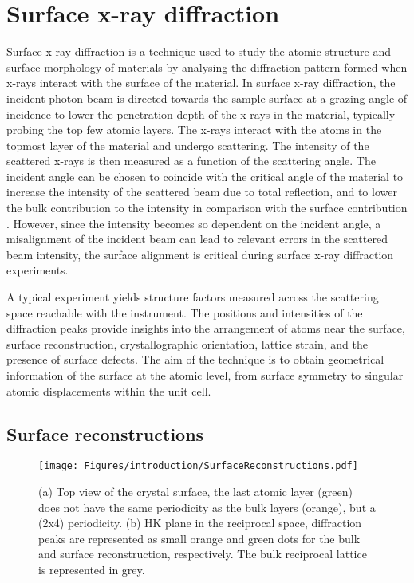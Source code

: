 \section{Surface x-ray diffraction} \label{sec:SXRD}

Surface x-ray diffraction is a technique used to study the atomic structure and surface morphology of materials by analysing the diffraction pattern formed when x-rays interact with the surface of the material.
In surface x-ray diffraction, the incident photon beam is directed towards the sample surface at a grazing angle of incidence to lower the penetration depth of the x-rays in the material, typically probing the top few atomic layers.
The x-rays interact with the atoms in the topmost layer of the material and undergo scattering.
The intensity of the scattered x-rays is then measured as a function of the scattering angle.
The incident angle can be chosen to coincide with the critical angle of the material to increase the intensity of the scattered beam due to total reflection, and to lower the bulk contribution to the intensity in comparison with the surface contribution \parencite{Feidenhansl1989, Moritz2022}.
However, since the intensity becomes so dependent on the incident angle, a misalignment of the incident beam can lead to relevant errors in the scattered beam intensity, the surface alignment is critical during surface x-ray diffraction experiments.

A typical experiment yields structure factors measured across the scattering space reachable with the instrument.
The positions and intensities of the diffraction peaks provide insights into the arrangement of atoms near the surface, surface reconstruction, crystallographic orientation, lattice strain, and the presence of surface defects.
The aim of the technique is to obtain geometrical information of the surface at the atomic level, from surface symmetry to singular atomic displacements within the unit cell.

\subsection{Surface reconstructions} \label{sec:SurfaceReconstructions}

\begin{figure}[!htb]
    \centering
    \texttt{[image: Figures/introduction/SurfaceReconstructions.pdf]}
    \caption{
    (a) Top view of the crystal surface, the last atomic layer (green) does not have the same periodicity as the bulk layers (orange), but a (2x4) periodicity.
    (b) HK plane in the reciprocal space, diffraction peaks are represented as small orange and green dots for the bulk and surface reconstruction, respectively. The bulk reciprocal lattice is represented in grey.
    }
    \label{fig:SurfaceReconstructions}
\end{figure}

